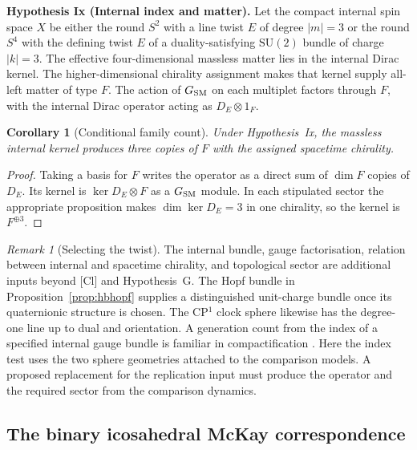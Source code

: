 \documentclass[aps,pra,onecolumn,superscriptaddress,nofootinbib,10pt]{revtex4-2}
\newtheorem{corollary}[theorem]{Corollary}
\theoremstyle{definition}
\theoremstyle{remark}
\newtheorem{remark}[theorem]{Remark}
\newcommand{\SU}{\mathrm{SU}}
\begin{document}
\smallskip\noindent\textbf{Hypothesis Ix (Internal index and matter).}\label{hyp:Ix}  Let the compact internal spin space $X$ be either the round $S^2$
with a line twist $E$ of degree $|m|=3$ or the round $S^4$ with the
defining twist $E$ of a duality-satisfying $\SU(2)$ bundle
of charge $|k|=3$. The effective
four-dimensional massless matter lies in the internal Dirac kernel.
The higher-dimensional chirality assignment makes that kernel supply
all-left matter of type $F$. The action of $G_{\rm SM}$ on each
multiplet factors through $F$, with the internal Dirac operator acting
as $D_E\otimes 1_F$.


\begin{corollary}[Conditional family count]\label{gn:conditional}
Under Hypothesis~Ix, the massless internal kernel
produces three copies of $F$ with the assigned spacetime chirality.
\end{corollary}
\begin{proof}
Taking a basis for $F$ writes the operator as a direct sum of
$\dim F$ copies of $D_E$. Its kernel is $\ker D_E\otimes F$ as a
$G_{\rm SM}$ module. In each stipulated sector the appropriate proposition
makes $\dim\ker D_E=3$ in one chirality, so the kernel is $F^{\oplus3}$.
\end{proof}
\begin{remark}[Selecting the twist]\label{gn:selection}
The internal bundle, gauge factorisation, relation between internal
and spacetime chirality, and topological sector are additional inputs
beyond [Cl] and Hypothesis~G. The Hopf bundle in
Proposition~\ref{prop:hbhopf} supplies a distinguished unit-charge bundle
once its quaternionic structure is chosen. The CP$^1$ clock sphere
likewise has the degree-one line up to dual and orientation.
A generation count from the index of a specified internal gauge bundle
is familiar in compactification \cite{gn:chsw,gn:cim}. Here the index
test uses the two sphere geometries attached to the comparison models.
A proposed replacement for the replication input must produce the
operator and the required sector from the comparison dynamics.
\end{remark}

\subsection{The binary icosahedral McKay correspondence}\label{gn:binary}
\end{document}
